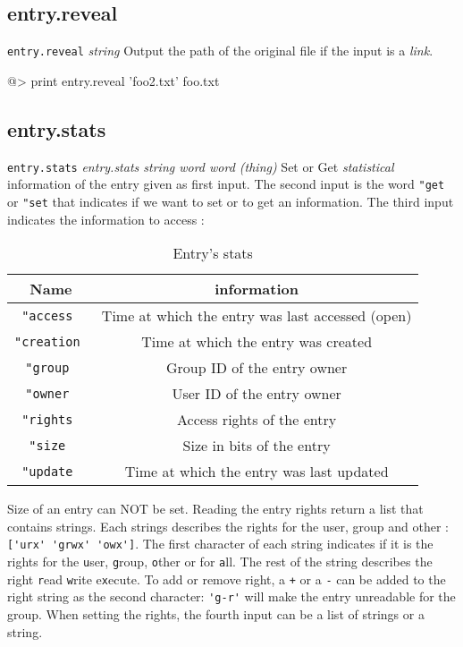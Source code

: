 \subsection*{entry.reveal} 

{\tt entry.reveal} {\it string}
\newline\newline
Output the path of the original file if the input is a {\it link}.
\begin{verbatimtab}
@> print entry.reveal 'foo2.txt'
foo.txt
\end{verbatimtab}

\clearpage

\subsection*{entry.stats} 

{\tt entry.stats} {\it entry.stats string word word (thing)}
\newline\newline
Set or Get {\em statistical} information of the entry given as first input. The second input is the word {\tt "get} or {\tt "set} that indicates if we want to set or to get an information. The third input indicates the information to access :

\begin{table}[!h]
\centering
\begin{tabular}{|c|c|}
\hline
\bf Name & information \\
\hline
\tt "access &  Time at which the entry was last accessed (open)\\
\hline
\tt "creation &  Time at which the entry was created\\
\hline
\tt "group &  Group ID of the entry owner\\
\hline
\tt "owner &  User ID of the entry owner\\
\hline
\tt "rights &  Access rights of the entry\\
\hline
\tt "size &  Size in bits of the entry\\
\hline
\tt "update &  Time at which the entry was last updated\\
\hline
\end{tabular}
\caption{Entry's stats}
\end{table}

Size of an entry can NOT be set. Reading the entry rights return a list that
contains strings. Each strings describes the rights for the user, group and other : {\tt \verb+['urx' 'grwx' 'owx']+}. The first character of each string
indicates if it is the rights for the {\tt u}ser, {\tt g}roup, {\tt o}ther or for {\tt a}ll. The rest of the string describes the right {\tt r}ead {\tt w}rite e{\tt x}ecute. To add or remove right, a {\tt +} or a {\tt -} can be added to the right string as the second character: {\tt \verb+'g-r'+} will make the entry unreadable for the group. When setting the rights, the fourth input can be a
list of strings or a string.

